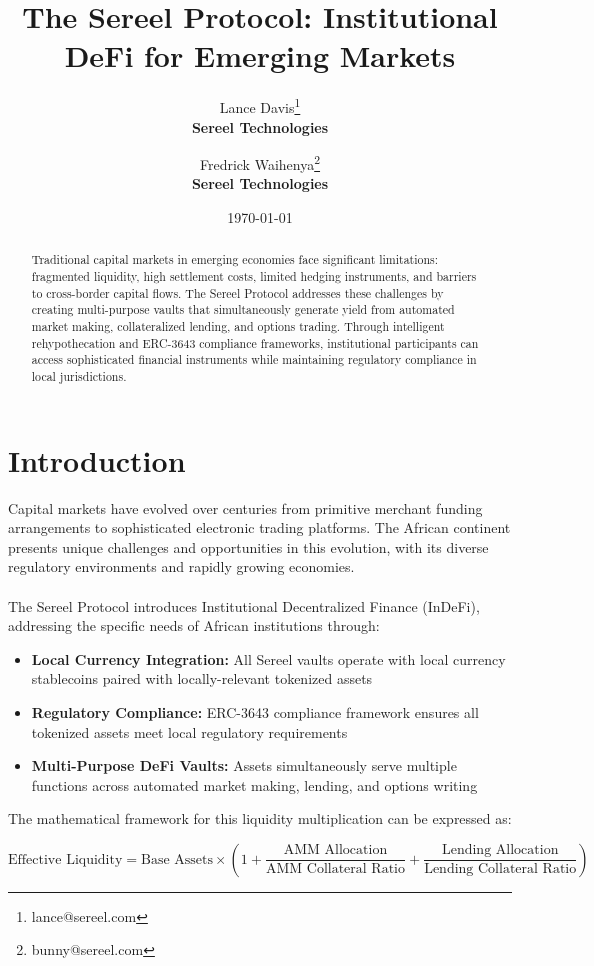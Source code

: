 \documentclass[12pt]{article}
\title{The Sereel Protocol: Institutional DeFi for Emerging Markets}
\author{
Lance Davis\thanks{lance@sereel.com} \\ 
\textbf{\small Sereel Technologies}
\and
Fredrick Waihenya\thanks{bunny@sereel.com} \\
\textbf{\small Sereel Technologies}
}
\date{\today}
\begin{document}
\maketitle

\begin{abstract}
Traditional capital markets in emerging economies face significant limitations: fragmented liquidity, high settlement costs, limited hedging instruments, and barriers to cross-border capital flows. The Sereel Protocol addresses these challenges by creating multi-purpose vaults that simultaneously generate yield from automated market making, collateralized lending, and options trading. Through intelligent rehypothecation and ERC-3643 compliance frameworks, institutional participants can access sophisticated financial instruments while maintaining regulatory compliance in local jurisdictions.
\end{abstract}

\section{Introduction}

Capital markets have evolved over centuries from primitive merchant funding arrangements to sophisticated electronic trading platforms. The African continent presents unique challenges and opportunities in this evolution, with its diverse regulatory environments and rapidly growing economies. \\
\\The Sereel Protocol introduces Institutional Decentralized Finance (InDeFi), addressing the specific needs of African institutions through:

\begin{itemize}
  \item \textbf{Local Currency Integration:} All Sereel vaults operate with local currency stablecoins paired with locally-relevant tokenized assets
  \item \textbf{Regulatory Compliance:} ERC-3643 compliance framework ensures all tokenized assets meet local regulatory requirements
  \item \textbf{Multi-Purpose DeFi Vaults:} Assets simultaneously serve multiple functions across automated market making, lending, and options writing
\end{itemize}

The mathematical framework for this liquidity multiplication can be expressed as:

$$\text{Effective Liquidity} = \text{Base Assets} \times \left(1 + \frac{\text{AMM Allocation}}{\text{AMM Collateral Ratio}} + \frac{\text{Lending Allocation}}{\text{Lending Collateral Ratio}}\right)$$
\end{document}

